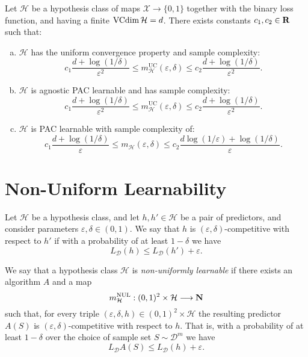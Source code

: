 \begin{theorem}
\label{thm:finite-vc-dim-sample-complexity-estimation}
Let \(\mathcal{H}\) be a hypothesis class of maps \(\mathcal{X} \to \{0, 1\}\) together with the
binary loss function, and having a finite \(\operatorname{VCdim} \mathcal{H} = d\). There exists
constants \(c_1, c_2 \in \mathbf{R}\) such that:
\begin{enumerate}[(a)]\setlength\itemsep{0em}
\item \(\mathcal{H}\) has the uniform convergence property and sample complexity:
  \[
  c_1 \frac{d + \log(1/\delta)}{\varepsilon^2} \leq
  m_{\mathcal{H}}^{\text{UC}}(\varepsilon, \delta) \leq
  c_2 \frac{d + \log(1/\delta)}{\varepsilon^2}.
  \]

\item \(\mathcal{H}\) is agnostic PAC learnable and has sample complexity:
  \[
  c_1 \frac{d + \log(1/\delta)}{\varepsilon^2} \leq
  m_{\mathcal{H}}^{\text{UC}}(\varepsilon, \delta) \leq
  c_2 \frac{d + \log(1/\delta)}{\varepsilon^2}.
  \]

\item \(\mathcal{H}\) is PAC learnable with sample complexity of:
  \[
  c_1 \frac{d + \log(1/\delta)}{\varepsilon} \leq
  m_{\mathcal{H}}(\varepsilon, \delta) \leq
  c_2 \frac{d \log(1/\varepsilon) + \log(1/\delta)}{\varepsilon}.
  \]
\end{enumerate}
\end{theorem}


\section{Non-Uniform Learnability}

\begin{definition}
\label{def:competitive-hypothesis}
Let \(\mathcal{H}\) be a hypothesis class, and let \(h, h' \in \mathcal{H}\) be a pair of predictors,
and consider parameters \(\varepsilon, \delta \in (0, 1)\). We say that \(h\) is
\((\varepsilon, \delta)\)-competitive with respect to \(h'\) if with a probability of at least
\(1 - \delta\) we have
\[
L_{\mathcal{D}}(h) \leq L_{\mathcal{D}}(h') + \varepsilon.
\]
\end{definition}

\begin{definition}
\label{def:non-uniform-learnable-hypothesis-class}
We say that a hypothesis class \(\mathcal{H}\) is \emph{non-uniformly learnable} if there
exists an algorithm \(A\) and a map
\[
m_{\mathcal{H}}^{\text{NUL}}: (0, 1)^2 \times \mathcal{H} \longrightarrow \mathbf{N}
\]
such that, for every triple \((\varepsilon, \delta, h) \in (0, 1)^2 \times \mathcal{H}\) the resulting predictor
\(A(S)\) is \((\varepsilon, \delta)\)-competitive with respect to \(h\). That is, with a
probability of at least \(1 - \delta\) over the choice of sample set \(S \sim \mathcal{D}^m\) we have
\[
L_{\mathcal{D}} A(S) \leq L_{\mathcal{D}}(h) + \varepsilon.
\]
\end{definition}

